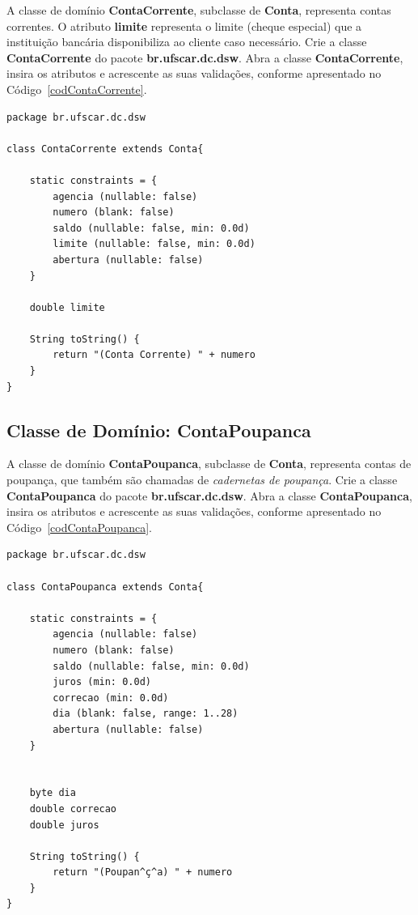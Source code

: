 \vspace{0.5cm}

A classe  de domínio {\bf  ContaCorrente}, subclasse de {\bf  Conta}, representa
contas correntes.  O atributo {\bf limite} representa o limite (cheque especial)
que a  instituição bancária  disponibiliza ao cliente  caso necessário.   Crie a
classe {\bf ContaCorrente} do pacote {\bf br.ufscar.dc.dsw}.  Abra a classe {\bf
  ContaCorrente}, insira os atributos  e acrescente as suas validações, conforme
apresentado no Código~\ref{codContaCorrente}. 

\begin{lstlisting}[caption=Classe de domínio  {\bf ContaCorrente}, frame = trBL,
    float=htbp, label=codContaCorrente] 
package br.ufscar.dc.dsw

class ContaCorrente extends Conta{

    static constraints = {
        agencia (nullable: false)
        numero (blank: false)
        saldo (nullable: false, min: 0.0d)
        limite (nullable: false, min: 0.0d)
        abertura (nullable: false)
    }
    
    double limite
    
    String toString() {
        return "(Conta Corrente) " + numero
    }
}
\end{lstlisting}

\subsection{Classe de Domínio: ContaPoupanca}\label{secContaPoupanca}

\vspace{0.5cm}

A classe  de domínio {\bf  ContaPoupanca}, subclasse de {\bf  Conta}, representa
contas de  poupança, que  também são chamadas  de {\em cadernetas  de poupança}.
Crie  a classe  {\bf ContaPoupanca}  do pacote  {\bf br.ufscar.dc.dsw}.   Abra a
classe {\bf ContaPoupanca}, insira os atributos e acrescente as suas validações,
conforme apresentado no Código~\ref{codContaPoupanca}. 

\begin{lstlisting}[caption=Classe de domínio  {\bf ContaPoupanca}, frame = trBL,
    float=htbp, label=codContaPoupanca] 
package br.ufscar.dc.dsw

class ContaPoupanca extends Conta{

    static constraints = {
        agencia (nullable: false)
        numero (blank: false)
        saldo (nullable: false, min: 0.0d)
        juros (min: 0.0d)
        correcao (min: 0.0d)
        dia (blank: false, range: 1..28)
        abertura (nullable: false)
    }
    
    
    byte dia    
    double correcao
    double juros
    
    String toString() {
        return "(Poupan^ç^a) " + numero
    }
}
\end{lstlisting}

